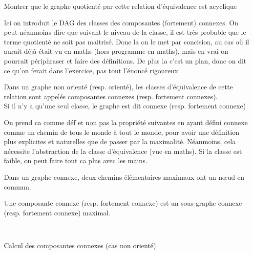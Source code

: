 \begin{exercise}
	Montrer que le graphe quotienté par cette relation d'équivalence est acyclique
\end{exercise}

\begin{com}
	Ici on introduit le DAG des classes des composantes (fortement) connexes. On peut néanmoins dire que suivant le niveau de la classe, il est très probable que le terme quotienté ne soit pas maitrisé. Donc la on le met par concision, au cas où il aurait déjà était vu en maths (hors programme en maths), mais en vrai on pourrait périphraser et faire des définitions. De plus la c'est un plan, donc on dit ce qu'on ferait dans l'exercice, pas tout l'énoncé rigoureux.
\end{com}

\begin{definition}
	Dans un graphe non orienté (resp. orienté), les classes d'équivalence de cette relation sont appelés composantes connexes (resp. fortement connexes).\\
	Si il n'y a qu'une seul classe, le graphe est dit connexe (resp. fortement connexe)
\end{definition}


\begin{com}
	On prend ca comme déf et non pas la propriété suivantes en ayant défini connexe comme un chemin de tous le monde à tout le monde, pour avoir une définition plus explicites et naturelles que de passer par la maximalité. Néanmoins, cela nécessite l'abstraction de la classe d'équivalence (vue en maths). Si la classe est faible, on peut faire tout ca plus avec les mains.
\end{com}

\begin{exercise}
	Dans un graphe connexe, deux chemins élémentaires maximaux ont un nœud en commun.
\end{exercise}

\begin{proposition}
	Une composante connexe (resp. fortement connexe) est un sous-graphe connexe (resp. fortement connexe) maximal.
\end{proposition}

\begin{algo} \enspace\\
	\begin{algorithm}[H]
		\caption{Calcul des composantes connexes (cas non orienté)}
	\end{algorithm}
\end{algo}

